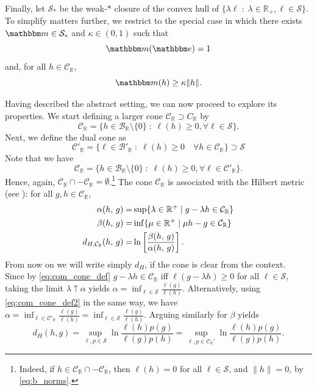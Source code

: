 \documentclass{amsart}
\numberwithin{equation}{section}
\newcommand\cB{{\mathcal B}}
\newcommand\cC{{\mathcal C}}
\newcommand\cS{{\mathcal S}}
\newcommand\bR{{\mathbb R}}
\newcommand{\bbe}{\mathbbm e}
\newcommand{\bbm}{\mathbbm m}
\begin{document}
Finally, let $\cS_*$ be the weak-$*$ closure of the convex hull of $\{\lambda\ell\;:\;\lambda\in\bR_+,\ell\in\cS\}$.
To simplify matters further, we restrict to the special case in which there exists $\bbm\in\cS_*$ and $\kappa\in (0,1)$ such that 
\begin{equation}\label{eq:m-normalization}
\bbm(\bbe)=1
\end{equation}
and, for all $h\in\cC_\bR$,
\begin{equation}\label{eq:maybetoomuch}
\bbm(h)\geq \kappa \|h\|.
\end{equation}

Having described the abstract setting, we can now proceed to explore its properties. 
We start defining a larger cone $\cC_\bR \supset C_\bR$ by
\begin{equation}\label{eq:com_cone_def}
\cC_\bR=\{h\in\cB_\bR\setminus \{0\}\;:\; \ell(h)\geq 0, \forall \ell\in\cS\}.
\end{equation}
Next, we define the dual cone as
\begin{equation}\label{eq:dual_cone_def}
\cC'_\bR=\{\ell\in \cB'_\bR\;:\; \ell(h)\geq 0\quad \forall h\in\cC_\bR\}\supset \cS
\end{equation}
Note that we have
\begin{equation}\label{eq:com_cone_def2}
\cC_\bR=\{h\in\cB_\bR\setminus \{0\}\;:\; \ell(h)\geq 0, \forall \ell\in\cC'_\bR\}.
\end{equation}
Hence, again, $\cC_\bR\cap -\cC_\bR=\emptyset$.\footnote{ Indeed, if $h\in \cC_\bR\cap -\cC_\bR$, then $\ell(h)=0$ for all $\ell\in \cS$, and $\|h\|=0$, by \eqref{eq:b_norms}.} 
The cone $\cC_{\bR}$ is associated with the Hilbert metric (see \cite[Equation (D.1.2)]{DKL}): for all $g,h\in \cC_{\bR}$,
\[
\aligned
\alpha (h,\,g)=&\sup\{\lambda\in\mathbb{R}^+\;|\; g-\lambda h\in\cC_{\bR}\}\\
\beta(h,\,g)=&\inf\{\mu\in\mathbb{R}^+\;|\; \mu h-g\in\cC_{\bR}\}\\
d_{H,\cC_\bR}(h,\,g)=&\ln \left[\frac{\beta(h,\,g)}{\alpha(h,\,g)}\right].
\endaligned
\]
From now on we will write simply $d_H$, if the cone is clear from the context.\\
Since by \eqref{eq:com_cone_def} $g - \lambda h \in \cC_{\bR}$ iff $\ell(g-\lambda h) \ge 0$ for all $\ell \in \cS$, taking the
limit $\lambda \uparrow \alpha$ yields $\alpha = \inf_{\ell \in \cS} \frac{\ell(g)}{\ell(h)}$.
Alternatively, using \eqref{eq:com_cone_def2} in the same way, we have
$\alpha = \inf_{\ell \in \cC'_{\bR}} \frac{\ell(g)}{\ell(h)} = \inf_{\ell \in \cS} \frac{\ell(g)}{\ell(h)}$.
Arguing similarly for $\beta$ yields
\begin{equation}\label{eq:hilbert_real}
d_H(h,g)=\sup_{\ell, p\in\cS}\ln\frac{\ell(h)p(g)}{\ell(g)p(h)}=\sup_{\ell, p\in\cC_{\bR}'}\ln\frac{\ell(h)p(g)}{\ell(g)p(h)}.
\end{equation}
\end{document}
